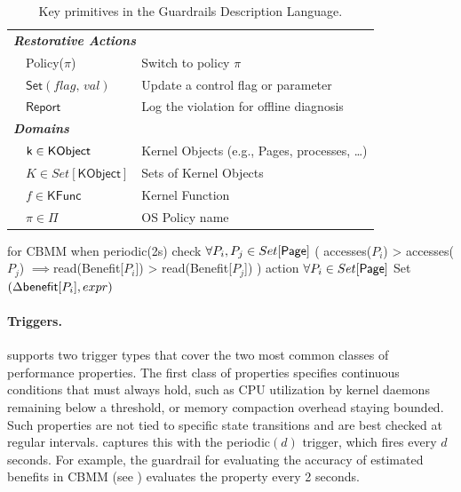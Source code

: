 \begin{table}[t]
\begin{tabular}{c l l}
\multicolumn{3}{l}{\bf \textit{Restorative Actions}}\\
  & \textsf{Policy}($\pi$) & Switch to policy $\pi$ \\
  & $\textsf{Set}(\mathit{flag},\,\mathit{val})$ & Update a control flag or parameter \\
  & $\textsf{Report}$ & Log the violation for offline diagnosis \\
\midrule
\multicolumn{3}{l}{\bf \textit{Domains}}\\
  & $\textsf k \in \textsf{KObject}$ & Kernel Objects (e.g., Pages, processes, \ldots) \\
  & $K \in Set[\textsf{KObject}]$ & Sets of Kernel Objects \\
  & $f \in \textsf{KFunc}$ & Kernel Function \\
  & $\pi \in \Pi$ & OS Policy name \\
\bottomrule
\end{tabular}
\caption{Key primitives in the Guardrails Description Language.}
\label{tab:gdl-primitives}
\end{table}

\begin{dslbox}[title={Guardrail~\theguardcount: Example guardrail for CBMM}, glabel=lst:benefit-correction]
for CBMM
when periodic(2s)
check $\forall P_i,P_j \in Set[{\sf Page}]$ (
      accesses($P_i$) > accesses($P_j$)
      $\implies$read(Benefit[$P_i$]) > read(Benefit[$P_j$])
  )
action $\forall P_i\in Set[{\sf Page}]$ Set$(\Delta{\sf benefit}[P_i], expr)$
\end{dslbox}

\paragraph{Triggers.}
\lang supports two trigger types that cover the two most common classes of performance properties.
The first class of properties specifies continuous conditions that must always hold, such as CPU utilization by kernel daemons remaining below a threshold, or memory compaction overhead staying bounded.
Such properties are not tied to specific state transitions and are best checked at regular intervals.
\lang captures this with the {\sf periodic}$(d)$ trigger, which fires every $d$ seconds.
For example, the guardrail for evaluating the accuracy of estimated benefits in CBMM (see ) evaluates the property every 2 seconds.


